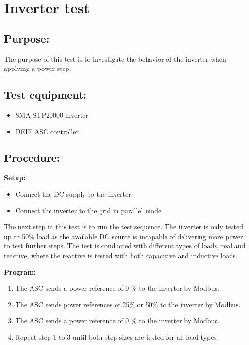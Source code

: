 \section{Inverter test}
\label{app:inverter_step_test}
\subsection*{Purpose:}
The purpose of this test is to investigate the behavior of the inverter when applying a power step.  

\subsection*{Test equipment:}

\begin{itemize}
\item SMA STP20000 inverter
\item DEIF ASC controller 
\end{itemize}

\subsection*{Procedure:}

\textbf{Setup:}
%
\begin{itemize}
\item Connect the DC supply to the inverter 
\item Connect the inverter to the grid in parallel mode
\end{itemize}

The next step in this test is to run the test sequence. 
The inverter is only tested up to 50\% load as the available DC source is incapable of delivering more power to test further steps.
The test is conducted with different types of loads, real and reactive, where the reactive is tested with both capacitive and inductive loads.  

\textbf{Program:}
\begin{enumerate}
\item The ASC sends a power reference of 0 \% to the inverter by Modbus.
\item The ASC sends power references of 25\% or 50\% to the inverter by Modbus.
\item The ASC sends a power reference of 0 \% to the inverter by Modbus.
\item Repeat step 1 to 3 until both step sizes are tested for all load types. 
\end{enumerate}


